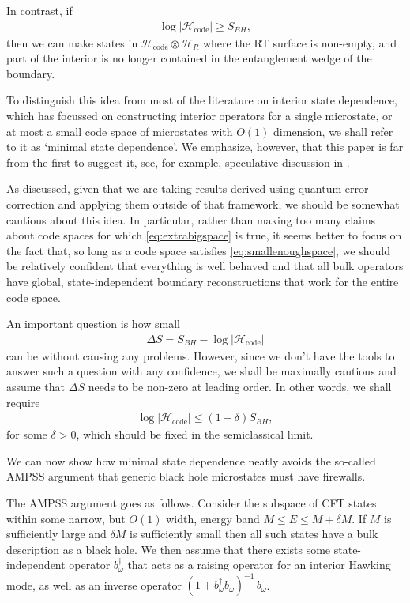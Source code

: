 \documentclass[11pt,a4paper]{article}
\begin{document}
In contrast, if
\begin{align} \label{eq:extrabigspace}
\log |\mathcal{H}_\text{code}| \geq S_{BH},
\end{align}
then we can make states in $\mathcal{H}_\text{code} \otimes \mathcal{H}_R$ where the RT surface is non-empty, and part of the interior is no longer contained in the entanglement wedge of the boundary.

To distinguish this idea from most of the literature on interior state dependence, which has focussed on constructing interior operators for a single microstate, or at most a small code space of microstates with $O(1)$ dimension, we shall refer to it as `minimal state dependence'. We emphasize, however, that this paper is far from the first to suggest it, see, for example, speculative discussion in \cite{papadodimas2013infalling}.

As discussed, given that we are taking results derived using quantum error correction and applying them outside of that framework, we should be somewhat cautious about this idea. In particular, rather than making too many claims about code spaces for which \eqref{eq:extrabigspace} is true, it seems better to focus on the fact that, so long as a code space satisfies \eqref{eq:smallenoughspace}, we should be relatively confident that everything is well behaved and that all bulk operators have global, state-independent boundary reconstructions that work for the entire code space. 

An important question is how small
\begin{align}
\Delta S = S_{BH} - \log |\mathcal{H}_\text{code}|
\end{align}
can be without causing any problems. However, since we don't have the tools to answer such a question with any confidence, we shall be maximally cautious and assume that $\Delta S$ needs to be non-zero at leading order. In other words, we shall require
\begin{align}
\log |\mathcal{H}_\text{code}| \leq (1-\delta) S_{BH},
\end{align}
for some $\delta > 0$, which should be fixed in the semiclassical limit.

We can now show how minimal state dependence neatly avoids the so-called AMPSS argument \cite{almheiri2013apologia} that generic black hole microstates must have firewalls. 
 
The AMPSS argument goes as follows. Consider the subspace of CFT states within some narrow, but $O(1)$ width, energy band $M \leq E \leq M + \delta M$. If $M$ is sufficiently large and $\delta M$ is sufficiently small then all such states have a bulk description as a black hole. We then assume that there exists some state-independent operator $b_\omega^\dagger$ that acts as a raising operator for an interior Hawking mode, as well as an inverse operator $(1 + b_\omega^\dagger b_\omega)^{-1}\, b_\omega$. 
\end{document}
